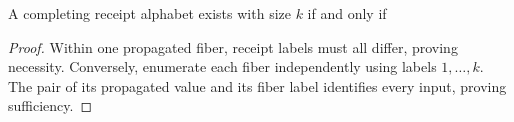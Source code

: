 \setcounter{theorem}{2}
\begin{proposition}
A completing receipt alphabet exists with size $k$ if and only if

\end{proposition}
\begin{proof}
Within one propagated fiber, receipt labels must all differ, proving necessity. Conversely, enumerate each fiber independently using labels $1,\ldots,k$. The pair of its propagated value and its fiber label identifies every input, proving sufficiency.
\end{proof}

